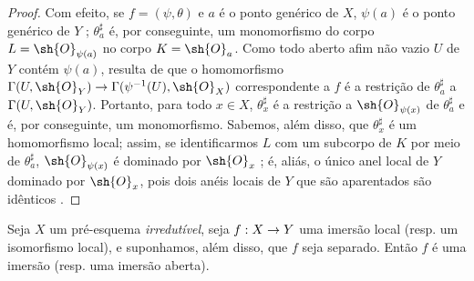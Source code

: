 \documentclass[oneside]{amsart}
\makeatletter
\newcommand{\ega@arrow}[2]{\mathchoice{#1}{#2}{#2}{#2}}
\renewcommand{\to}{\ega@arrow{\longrightarrow}{\rightarrow}}
\let\EGAOriginalLabel\label
\renewcommand{\label}[1]{\phantomsection\EGAOriginalLabel{#1}}
\makeatother
\begin{document}
\begin{proof}
Com efeito, se $f=(\psi,\theta)$ e $a$ é o ponto genérico de $X$, $\psi(a)$ é o ponto genérico de $Y$ ;
$\theta_a^\sharp$ é, por conseguinte, um monomorfismo do corpo $L=\sh{O}_{\psi(a)}$ no corpo $K=\sh{O}_a$.
Como todo aberto afim não vazio $U$ de $Y$ contém $\psi(a)$, resulta de  que o homomorfismo $\Gamma(U,\sh{O}_Y)\to\Gamma(\psi^{-1}(U),\sh{O}_X)$ correspondente a $f$ é a restrição de $\theta_a^\sharp$ a $\Gamma(U,\sh{O}_Y)$.
Portanto, para todo $x\in X$, $\theta_x^\sharp$ é a restrição a $\sh{O}_{\psi(x)}$ de $\theta_a^\sharp$ e é, por conseguinte, um monomorfismo.
Sabemos, além disso, que $\theta_x^\sharp$ é um homomorfismo local; assim, se identificarmos $L$ com um subcorpo de $K$ por meio de $\theta_a^\sharp$, $\sh{O}_{\psi(x)}$ é dominado por $\sh{O}_x$ ;
é, aliás, o único anel local de $Y$ dominado por $\sh{O}_x$, pois dois anéis locais de $Y$ que são aparentados são idênticos .
\end{proof}

\begin{proposition}[8.2.8]
\label{I.8.2.8}
Seja $X$ um pré-esquema \emph{irredutível}, seja $f:X\to Y$ uma imersão local (resp. um isomorfismo local), e suponhamos, além disso, que $f$ seja separado. Então $f$ é uma imersão (resp. uma imersão aberta).
\end{proposition}
\end{document}
